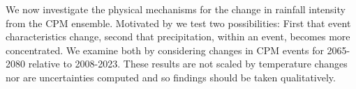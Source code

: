 \documentclass[11pt,a4paper]{article}
\begin{document}
We now investigate the physical mechanisms for the change in rainfall intensity from the CPM ensemble. Motivated by \cite{fowler2021rainfall_extremes} we test two possibilities:  First that event characteristics change, second  that precipitation, within an event, becomes more concentrated. We examine both by considering changes in CPM events for 2065-2080 relative to 2008-2023. These results are not scaled by temperature changes nor are uncertainties computed and so findings should be taken qualitatively. 

\end{document}
